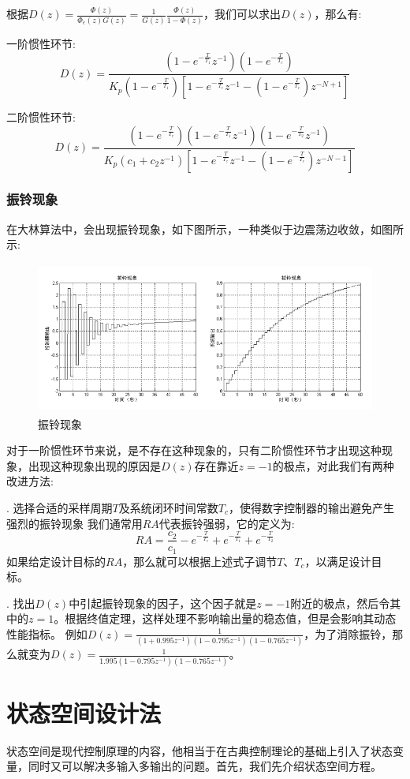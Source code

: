 \documentclass[12pt, a4paper, oneside]{ctexbook}
\begin{document}
\noindent 根据$D(z)=\frac{\varPhi(z)}{\varPhi_e(z)G(z)}=\frac{1}{G(z)}\frac{\varPhi(z)}{1-\varPhi(z)}$，我们可以求出$D(z)$，那么有:

\noindent 一阶惯性环节:
$$
D(z)=\frac{(1-e^{-\frac{T}{T_1}}z^{-1})(1-e^{-\frac{T}{T_c}})}{K_p(1-e^{-\frac{T}{T_1}})[1-e^{-\frac{T}{T_c}}z^{-1}-(1-e^{-\frac{T}{T_c}})z^{-N+1}]}
$$

\noindent 二阶惯性环节:
$$
D(z)=\frac{(1-e^{-\frac{T}{T_c}})(1-e^{-\frac{T}{T_1}}z^{-1})(1-e^{-\frac{T}{T_2}}z^{-1})}{K_p(c_1+c_2z^{-1})[1-e^{-\frac{T}{T_c}}z^{-1}-(1-e^{-\frac{T}{T_c}})z^{-N-1}]}
$$
\subsubsection{振铃现象}
在大林算法中，会出现振铃现象，如下图所示，一种类似于边震荡边收敛，如图所示:
\begin{figure}[htbp]
	\centering
	\includegraphics[width=12cm,height=5cm]{img/6_11.png}
	\caption{振铃现象}
\end{figure}

对于一阶惯性环节来说，是不存在这种现象的，只有二阶惯性环节才出现这种现象，出现这种现象出现的原因是$D(z)$存在靠近$z=-1$的极点，对此我们有两种改进方法:

. 选择合适的采样周期$T$及系统闭环时间常数$T_c$，使得数字控制器的输出避免产生强烈的振铃现象
我们通常用$RA$代表振铃强弱，它的定义为:
$$
RA=\frac{c_2}{c_1}-e^{-\frac{T}{T_c}}+e^{-\frac{T}{T_1}}+e^{-\frac{T}{T_2}}
$$
如果给定设计目标的$RA$，那么就可以根据上述式子调节$T$、$T_c$，以满足设计目标。

. 找出$D(z)$中引起振铃现象的因子，这个因子就是$z=-1$附近的极点，然后令其中的$z=1$。根据终值定理，这样处理不影响输出量的稳态值，但是会影响其动态性能指标。
例如$D(z)=\frac{1}{(1+0.995z^{-1})(1-0.795z^{-1})(1-0.765z^{-1})}$，为了消除振铃，那么就变为$D(z)=\frac{1}{1.995(1-0.795z^{-1})(1-0.765z^{-1})}$。
\section{状态空间设计法}
状态空间是现代控制原理的内容，他相当于在古典控制理论的基础上引入了状态变量，同时又可以解决多输入多输出的问题。首先，我们先介绍状态空间方程。
\end{document}
